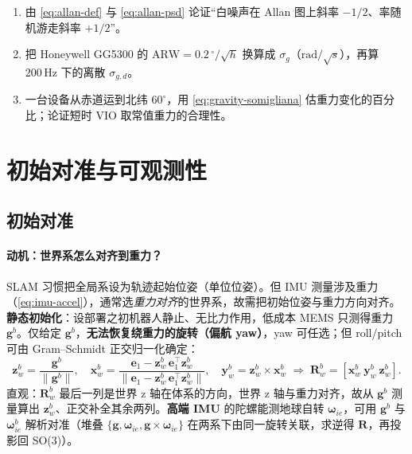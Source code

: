 \begin{practice}
\begin{enumerate}
  \item 由 \cref{eq:allan-def} 与 \cref{eq:allan-psd} 论证“白噪声在 Allan 图上斜率 $-1/2$、率随机游走斜率 $+1/2$”。
  \item 把 Honeywell GG5300 的 $\mathrm{ARW}=0.2\,^\circ/\sqrt h$ 换算成 $\sigma_g$（$\mathrm{rad}/\sqrt s$），再算 $200\,\mathrm{Hz}$ 下的离散 $\sigma_{g,d}$。
  \item 一台设备从赤道运到北纬 $60^\circ$，用 \cref{eq:gravity-somigliana} 估重力变化的百分比；论证短时 VIO 取常值重力的合理性。
\end{enumerate}
\end{practice}

\section{初始对准与可观测性}
\label{sec:imu-obs}

\subsection{初始对准}
\label{subsec:init-align}

\paragraph{动机：世界系怎么对齐到重力？}
SLAM 习惯把全局系设为轨迹起始位姿（单位位姿）。但 IMU 测量涉及重力（\cref{eq:imu-accel}），通常选\emph{重力对齐}的世界系，故需把初始位姿与重力方向对齐\cite{carlone2026handbook}。\textbf{静态初始化}：设部署之初机器人静止、无比力作用，低成本 MEMS 只测得重力 $\mathbf g^b$。仅给定 $\mathbf g^b$，\textbf{无法恢复绕重力的旋转（偏航 yaw）}，yaw 可任选；但 roll/pitch 可由 Gram--Schmidt 正交归一化确定：
\begin{equation}
  \mathbf z_w^b=\frac{\mathbf g^b}{\|\mathbf g^b\|},\quad
  \mathbf x_w^b=\frac{\mathbf e_1-\mathbf z_w^b\,\mathbf e_1^\top\mathbf z_w^b}{\|\mathbf e_1-\mathbf z_w^b\,\mathbf e_1^\top\mathbf z_w^b\|},\quad
  \mathbf y_w^b=\mathbf z_w^b\times\mathbf x_w^b
  \;\Rightarrow\;\mathbf R_w^b=[\mathbf x_w^b\ \mathbf y_w^b\ \mathbf z_w^b].
  \label{eq:static-align}
\end{equation}
直观：$\mathbf R_w^b$ 最后一列是世界 z 轴在体系的方向，世界 z 轴与重力对齐，故从 $\mathbf g^b$ 测量算出 $\mathbf z_w^b$、正交补全其余两列。\textbf{高端 IMU} 的陀螺能测地球自转 $\boldsymbol\omega_{ie}$，可用 $\mathbf g^b$ 与 $\boldsymbol\omega_{ie}^b$ 解析对准（堆叠 $\{\mathbf g,\boldsymbol\omega_{ie},\mathbf g\times\boldsymbol\omega_{ie}\}$ 在两系下由同一旋转关联，求逆得 $\mathbf R$，再投影回 SO(3)）。

